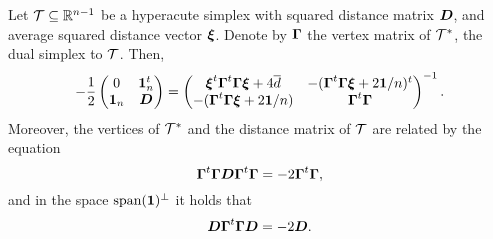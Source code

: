 \begin{lemma}
	\label{lem:block_inverse_simplex}
	Let $\mathcal{T}\subseteq\mathbb{R}^{n-1}$ be a hyperacute simplex with  squared distance matrix $\vb*{D}$, and average squared distance vector $\vb*{\xi}$. Denote by $\vb*{\Gamma}$ the vertex matrix of $\mathcal{T}^*$, the dual simplex to $\mathcal{T}$. Then, 
	\begin{equation}
	\label{eq:simplex_block_matrix}
	-\frac{1}{2} \begin{pmatrix}
	0 & \vb{1}_n^t \\ 
	\vb{1}_n &  \vb*{D}
	\end{pmatrix} = \begin{pmatrix}
	\vb*{\xi}^t \vb*{\Gamma}^t \vb*{\Gamma}\vb*{\xi} + 4\overline{d} & -(\vb*{\Gamma}^t \vb*{\Gamma}\vb*{\xi} + 2\vb{1}/n)^t \\
	-(\vb*{\Gamma}^t \vb*{\Gamma}\vb*{\xi} + 2\vb{1}/n) & \vb*{\Gamma}^t \vb*{\Gamma}
	\end{pmatrix}^{-1}.
	\end{equation}
	Moreover, the vertices of $\mathcal{T}^*$ and the distance matrix of $\mathcal{T}$ are related by the equation
	\begin{equation}
	\label{eq:lem_inverse_relation}
	\vb*{\Gamma}^t \vb*{\Gamma} \vb*{D} \vb*{\Gamma}^t \vb*{\Gamma} = -2\vb*{\Gamma}^t \vb*{\Gamma},
	\end{equation}
	and in the space $\textnormal{span}(\vb{1})^\perp$ it holds that 
	\begin{equation*}
	\label{eq:lem_inverse_relation2}
	\vb*{D}\vb*{\Gamma}^t \vb*{\Gamma} \vb*{D}= -2\vb*{D}.	
	\end{equation*}
\end{lemma}

